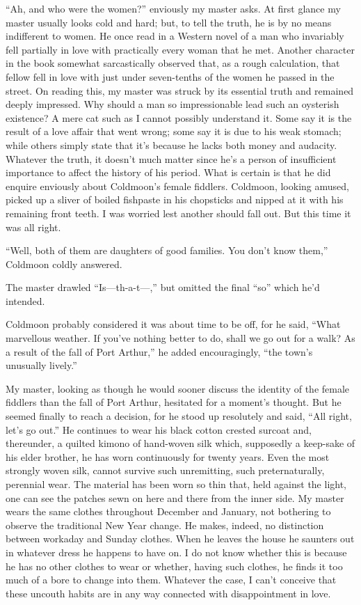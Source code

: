 \documentclass{book}
\begin{document}
``Ah, and who were the women?'' enviously my master asks. At first
glance my master usually looks cold and hard; but, to tell the truth, he
is by no means indifferent to women. He once read in a Western novel of
a man who invariably fell partially in love with practically every woman
that he met. Another character in the book somewhat sarcastically
observed that, as a rough calculation, that fellow fell in love with
just under seven-tenths of the women he passed in the street. On reading
this, my master was struck by its essential truth and remained deeply
impressed. Why should a man so impressionable lead such an oysterish
existence? A mere cat such as I cannot possibly understand it. Some say
it is the result of a love affair that went wrong; some say it is due to
his weak stomach; while others simply state that it's because he lacks
both money and audacity. Whatever the truth, it doesn't much matter
since he's a person of insufficient importance to affect the history of
his period. What is certain is that he did enquire enviously about
Coldmoon's female fiddlers. Coldmoon, looking amused, picked up a sliver
of boiled fishpaste in his chopsticks and nipped at it with his
remaining front teeth. I was worried lest another should fall out. But
this time it was all right.

``Well, both of them are daughters of good families. You don't know
them,'' Coldmoon coldly answered.

The master drawled ``Is---th-a-t---,'' but omitted the final ``so''
which he'd intended.

Coldmoon probably considered it was about time to be off, for he said,
``What marvellous weather. If you've nothing better to do, shall we go
out for a walk? As a result of the fall of Port Arthur,'' he added
encouragingly, ``the town's unusually lively.''

My master, looking as though he would sooner discuss the identity of the
female fiddlers than the fall of Port Arthur, hesitated for a moment's
thought. But he seemed finally to reach a decision, for he stood up
resolutely and said, ``All right, let's go out.'' He continues to wear
his black cotton crested surcoat and, thereunder, a quilted kimono of
hand-woven silk which, supposedly a keep-sake of his elder brother, he
has worn continuously for twenty years. Even the most strongly woven
silk, cannot survive such unremitting, such preternaturally, perennial
wear. The material has been worn so thin that, held against the light,
one can see the patches sewn on here and there from the inner side. My
master wears the same clothes throughout December and January, not
bothering to observe the traditional New Year change. He makes, indeed,
no distinction between workaday and Sunday clothes. When he leaves the
house he saunters out in whatever dress he happens to have on. I do not
know whether this is because he has no other clothes to wear or whether,
having such clothes, he finds it too much of a bore to change into them.
Whatever the case, I can't conceive that these uncouth habits are in any
way connected with disappointment in love.
\end{document}
